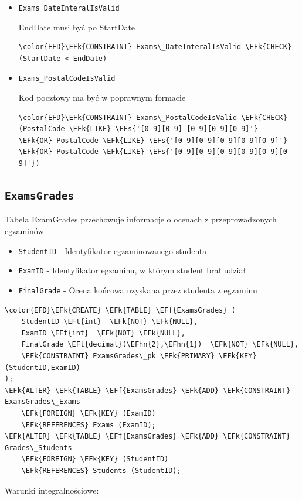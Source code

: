 \documentclass[11pt]{article}
\newcommand{\EFs}[1]{\textcolor{EFs}{#1}} %
\newcommand{\EFk}[1]{\textcolor{EFk}{\textbf{#1}}} %
\newcommand{\EFf}[1]{\textcolor{EFf}{#1}} %
\newcommand{\EFt}[1]{\textcolor{EFt}{\textbf{#1}}} %
\newcommand{\EFhn}[1]{\textcolor{EFhn}{#1}} %
\begin{document}
\begin{itemize}
\item \texttt{Exams\_DateInteralIsValid}

EndDate musi być po StartDate
\begin{Code}
\begin{Verbatim}
\color{EFD}\EFk{CONSTRAINT} Exams\_DateInteralIsValid \EFk{CHECK}
(StartDate < EndDate)
\end{Verbatim}
\end{Code}
\item \texttt{Exams\_PostalCodeIsValid}

Kod pocztowy ma być w poprawnym formacie
\begin{Code}
\begin{Verbatim}
\color{EFD}\EFk{CONSTRAINT} Exams\_PostalCodeIsValid \EFk{CHECK}
(PostalCode \EFk{LIKE} \EFs{'[0-9][0-9]-[0-9][0-9][0-9]'}
\EFk{OR} PostalCode \EFk{LIKE} \EFs{'[0-9][0-9][0-9][0-9][0-9]'}
\EFk{OR} PostalCode \EFk{LIKE} \EFs{'[0-9][0-9][0-9][0-9][0-9][0-9]'})
\end{Verbatim}
\end{Code}
\end{itemize}
\subsection{\texttt{ExamsGrades}}
\label{sec:org7cc5571}
Tabela ExamGrades przechowuje informacje o ocenach z przeprowadzonych egzaminów.
\begin{itemize}
\item \texttt{StudentID} - Identyfikator egzaminowanego studenta
\item \texttt{ExamID} - Identyfikator egzaminu, w którym student brał udział
\item \texttt{FinalGrade} - Ocena końcowa uzyskana przez studenta z egzaminu
\end{itemize}
\begin{Code}
\begin{Verbatim}
\color{EFD}\EFk{CREATE} \EFk{TABLE} \EFf{ExamsGrades} (
    StudentID \EFt{int}  \EFk{NOT} \EFk{NULL},
    ExamID \EFt{int}  \EFk{NOT} \EFk{NULL},
    FinalGrade \EFt{decimal}(\EFhn{2},\EFhn{1})  \EFk{NOT} \EFk{NULL},
    \EFk{CONSTRAINT} ExamsGrades\_pk \EFk{PRIMARY} \EFk{KEY}  (StudentID,ExamID)
);
\EFk{ALTER} \EFk{TABLE} \EFf{ExamsGrades} \EFk{ADD} \EFk{CONSTRAINT} ExamsGrades\_Exams
    \EFk{FOREIGN} \EFk{KEY} (ExamID)
    \EFk{REFERENCES} Exams (ExamID);
\EFk{ALTER} \EFk{TABLE} \EFf{ExamsGrades} \EFk{ADD} \EFk{CONSTRAINT} Grades\_Students
    \EFk{FOREIGN} \EFk{KEY} (StudentID)
    \EFk{REFERENCES} Students (StudentID);
\end{Verbatim}
\end{Code}
Warunki integralnościowe:
\end{document}
